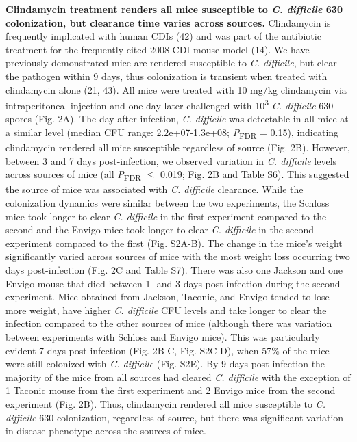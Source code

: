 \documentclass[
  11pt,
]{article}
\begin{document}
\textbf{Clindamycin treatment renders all mice susceptible to \emph{C.
difficile} 630 colonization, but clearance time varies across sources.}
Clindamycin is frequently implicated with human CDIs (42) and was part
of the antibiotic treatment for the frequently cited 2008 CDI mouse
model (14). We have previously demonstrated mice are rendered
susceptible to \emph{C. difficile}, but clear the pathogen within 9
days, thus colonization is transient when treated with clindamycin alone
(21, 43). All mice were treated with 10 mg/kg clindamycin via
intraperitoneal injection and one day later challenged with
10\textsuperscript{3} \emph{C. difficile} 630 spores (Fig. 2A). The day
after infection, \emph{C. difficile} was detectable in all mice at a
similar level (median CFU range: 2.2e+07-1.3e+08;
\emph{P}\textsubscript{FDR} = 0.15), indicating clindamycin rendered all
mice susceptible regardless of source (Fig. 2B). However, between 3 and
7 days post-infection, we observed variation in \emph{C. difficile}
levels across sources of mice (all \emph{P}\textsubscript{FDR} \(\le\)
0.019; Fig. 2B and Table S6). This suggested the source of mice was
associated with \emph{C. difficile} clearance. While the colonization
dynamics were similar between the two experiments, the Schloss mice took
longer to clear \emph{C. difficile} in the first experiment compared to
the second and the Envigo mice took longer to clear \emph{C. difficile}
in the second experiment compared to the first (Fig. S2A-B). The change
in the mice's weight significantly varied across sources of mice with
the most weight loss occurring two days post-infection (Fig. 2C and
Table S7). There was also one Jackson and one Envigo mouse that died
between 1- and 3-days post-infection during the second experiment. Mice
obtained from Jackson, Taconic, and Envigo tended to lose more weight,
have higher \emph{C. difficile} CFU levels and take longer to clear the
infection compared to the other sources of mice (although there was
variation between experiments with Schloss and Envigo mice). This was
particularly evident 7 days post-infection (Fig. 2B-C, Fig. S2C-D), when
57\% of the mice were still colonized with \emph{C. difficile} (Fig.
S2E). By 9 days post-infection the majority of the mice from all sources
had cleared \emph{C. difficile} with the exception of 1 Taconic mouse
from the first experiment and 2 Envigo mice from the second experiment
(Fig. 2B). Thus, clindamycin rendered all mice susceptible to \emph{C.
difficile} 630 colonization, regardless of source, but there was
significant variation in disease phenotype across the sources of mice.
\end{document}
